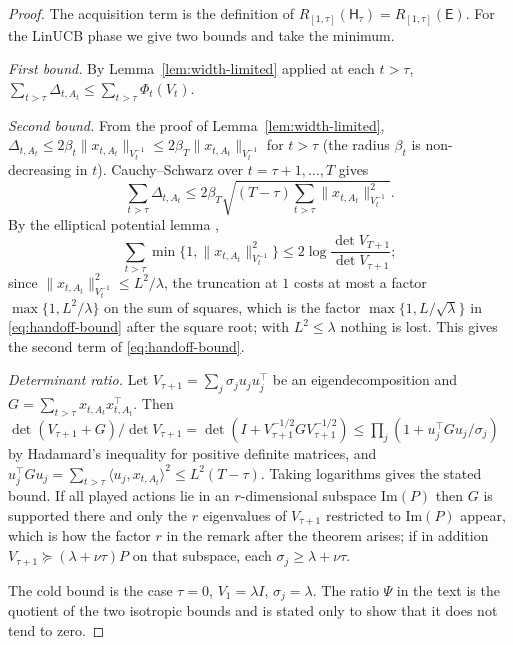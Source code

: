 \documentclass[anon]{alt2027} %
\newcommand{\Exp}{\mathsf{E}}
\newcommand{\Hyb}{\mathsf{H}}
\begin{document}
\begin{proof}
The acquisition term is the definition of $R_{[1,\tau]}(\Hyb_\tau)=R_{[1,\tau]}(\Exp)$.
For the LinUCB phase we give two bounds and take the minimum.

\emph{First bound.} By Lemma~\ref{lem:width-limited} applied at each
$t>\tau$, $\sum_{t>\tau}\Delta_{t,A_t}\le\sum_{t>\tau}\Phi_t(V_t)$.

\emph{Second bound.} From the proof of Lemma~\ref{lem:width-limited},
$\Delta_{t,A_t}\le2\beta_t\|x_{t,A_t}\|_{V_t^{-1}}\le2\beta_T\|x_{t,A_t}\|_{V_t^{-1}}$
for $t>\tau$ (the radius $\beta_t$ is non-decreasing in $t$). Cauchy--Schwarz
over $t=\tau+1,\dots,T$ gives
\[
\sum_{t>\tau}\Delta_{t,A_t}\le2\beta_T\sqrt{(T-\tau)\sum_{t>\tau}\|x_{t,A_t}\|^2_{V_t^{-1}}} .
\]
By the elliptical potential lemma \citep[Lemma~11]{abbasi2011improved},
\[
\sum_{t>\tau}\min\{1,\|x_{t,A_t}\|^2_{V_t^{-1}}\}\le2\log\frac{\det V_{T+1}}{\det V_{\tau+1}};
\]
since $\|x_{t,A_t}\|^2_{V_t^{-1}}\le L^2/\lambda$, the truncation at $1$ costs at
most a factor $\max\{1,L^2/\lambda\}$ on the sum of squares, which is the
factor $\max\{1,L/\sqrt\lambda\}$ in \eqref{eq:handoff-bound} after the square
root; with $L^2\le\lambda$ nothing is lost. This gives
the second term of \eqref{eq:handoff-bound}.

\emph{Determinant ratio.} Let $V_{\tau+1}=\sum_j\sigma_ju_ju_j^\top$ be an
eigendecomposition and $G=\sum_{t>\tau}x_{t,A_t}x_{t,A_t}^\top$. Then
$\det(V_{\tau+1}+G)/\det V_{\tau+1}=\det(I+V_{\tau+1}^{-1/2}GV_{\tau+1}^{-1/2})\le\prod_j(1+u_j^\top Gu_j/\sigma_j)$
by Hadamard's inequality for positive definite matrices, and
$u_j^\top Gu_j=\sum_{t>\tau}\langle u_j,x_{t,A_t}\rangle^2\le L^2(T-\tau)$.
Taking logarithms gives the stated bound. If all played actions lie in an
$r$-dimensional subspace $\mathrm{Im}(P)$ then $G$ is supported there and only
the $r$ eigenvalues of $V_{\tau+1}$ restricted to $\mathrm{Im}(P)$ appear, which
is how the factor $r$ in the remark after the theorem arises; if in addition
$V_{\tau+1}\succeq(\lambda+\nu\tau)P$ on that subspace, each $\sigma_j\ge\lambda+\nu\tau$.

The cold bound is the case $\tau=0$, $V_1=\lambda I$, $\sigma_j=\lambda$. The
ratio $\Psi$ in the text is the quotient of the two isotropic bounds and is
stated only to show that it does not tend to zero.
\end{proof}
\end{document}
